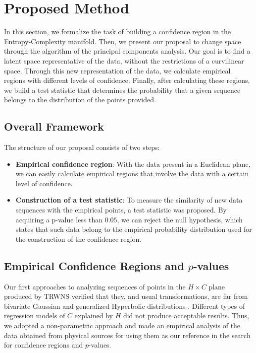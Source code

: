 \section{Proposed Method}

In this section, we formalize the task of building a confidence region in the Entropy-Complexity manifold.
Then, we present our proposal to change space through the algorithm of the principal components analysis.
Our goal is to find a latent space representative of the data, without the restrictions of a curvilinear space.
Through this new representation of the data, we calculate empirical regions with different levels of confidence.
Finally, after calculating these regions, we build a test statistic that determines the probability that a given sequence belongs to the distribution of the points provided.

\subsection{Overall Framework}

The structure of our proposal consists of two steps:
\begin{itemize}
    \item \textbf{Empirical confidence region}: With the data present in a Euclidean plane, we can easily calculate empirical regions that involve the data with a certain level of confidence.
    \item \textbf{Construction of a test statistic}: To measure the similarity of new data sequences with the empirical points, a test statistic was proposed. 
    By acquiring a p-value less than $0.05$, we can reject the null hypothesis, which states that such data belong to the empirical probability distribution used for the construction of the confidence region.
\end{itemize}

\subsection{Empirical Confidence Regions and \texorpdfstring{$p$}--values}\label{confidenceRegions}

Our first approaches to analyzing sequences of points in the $H\times C$ plane produced by TRWNS verified that they, and usual transformations, are far from bivariate Gaussian and generalized Hyperbolic distributions \citep{MultivariateDistributionModelswithGeneralizedHyperbolicMargins}.
Different types of regression models of $C$ explained by $H$ did not produce acceptable results.
Thus, we adopted a non-parametric approach and made an empirical analysis of the data obtained from physical sources for using them as our reference in the search for confidence regions and $p$-values.

